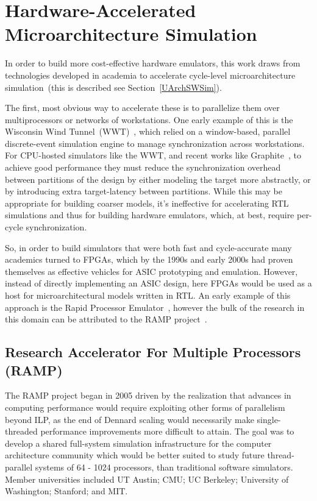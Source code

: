 \section{Hardware-Accelerated Microarchitecture Simulation}

In order to build more cost-effective hardware emulators, this work draws from
technologies developed in academia to accelerate cycle-level microarchitecture
simulation~(this is described see Section~\ref{UArchSWSim}).

The first, most obvious way to accelerate these is to
parallelize them over multiprocessors or networks of workstations.
One early example of this is the Wisconsin Wind Tunnel~(WWT)~\cite{WisconsinWindTunnel}, which relied
on a window-based, parallel discrete-event simulation engine to manage synchronization
across workstations. For CPU-hosted simulators like the WWT, and recent works like Graphite~\cite{Graphite}, to achieve
good performance they must reduce the synchronization overhead between
partitions of the design by either modeling the target more abstractly, or by
introducing extra target-latency between partitions.  While this may be
appropriate for building coarser models, it's ineffective for accelerating RTL
simulations and thus for building hardware emulators, which, at best, require
per-cycle synchronization.

So, in order to build simulators that were both fast and cycle-accurate
many academics turned to FPGAs, which by the 1990s and early 2000s had proven themselves as effective
vehicles for ASIC prototyping and emulation. However, instead of directly implementing an
ASIC design, here FPGAs would be used as a host for microarchitectural models written in RTL.
An early example of this approach is the Rapid Processor Emulator~\cite{RPM, RPMDesign}, however the bulk of the research
in this domain can be attributed to the RAMP project~\cite{RAMP}.

\subsection{Research Accelerator For Multiple Processors (RAMP)}

The RAMP project began in 2005 driven by the realization that advances in computing performance
would require exploiting other forms of parallelism beyond ILP, as the end of
Dennard scaling would necessarily make single-threaded performance improvements
more difficult to attain. The goal was to develop a shared full-system
simulation infrastructure for the computer architecture community which would
be better suited to study future thread-parallel systems of 64 - 1024
processors, than traditional software simulators. Member universities included UT
Austin; CMU; UC Berkeley; University of Washington; Stanford; and MIT.

